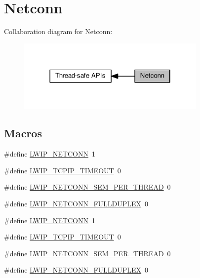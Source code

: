 \hypertarget{group__lwip__opts__netconn}{}\section{Netconn}
\label{group__lwip__opts__netconn}
Collaboration diagram for Netconn\+:
\nopagebreak
\begin{figure}[H]
\begin{center}
\leavevmode
\includegraphics[width=262pt]{group__lwip__opts__netconn}
\end{center}
\end{figure}
\subsection*{Macros}
\begin{DoxyCompactItemize}
\item 
\#define \hyperlink{group__lwip__opts__netconn_ga478041b8544461258f6961bf0f3c1a77}{L\+W\+I\+P\+\_\+\+N\+E\+T\+C\+O\+NN}~1
\item 
\#define \hyperlink{group__lwip__opts__netconn_ga1cd8d15a42262a0defaedabed126ea99}{L\+W\+I\+P\+\_\+\+T\+C\+P\+I\+P\+\_\+\+T\+I\+M\+E\+O\+UT}~0
\item 
\#define \hyperlink{group__lwip__opts__netconn_ga2543345adf7d2c307df78a54ac2ba8c4}{L\+W\+I\+P\+\_\+\+N\+E\+T\+C\+O\+N\+N\+\_\+\+S\+E\+M\+\_\+\+P\+E\+R\+\_\+\+T\+H\+R\+E\+AD}~0
\item 
\#define \hyperlink{group__lwip__opts__netconn_ga7bfe8487a3abffdd9d6730977d22c406}{L\+W\+I\+P\+\_\+\+N\+E\+T\+C\+O\+N\+N\+\_\+\+F\+U\+L\+L\+D\+U\+P\+L\+EX}~0
\item 
\#define \hyperlink{group__lwip__opts__netconn_ga478041b8544461258f6961bf0f3c1a77}{L\+W\+I\+P\+\_\+\+N\+E\+T\+C\+O\+NN}~1
\item 
\#define \hyperlink{group__lwip__opts__netconn_ga1cd8d15a42262a0defaedabed126ea99}{L\+W\+I\+P\+\_\+\+T\+C\+P\+I\+P\+\_\+\+T\+I\+M\+E\+O\+UT}~0
\item 
\#define \hyperlink{group__lwip__opts__netconn_ga2543345adf7d2c307df78a54ac2ba8c4}{L\+W\+I\+P\+\_\+\+N\+E\+T\+C\+O\+N\+N\+\_\+\+S\+E\+M\+\_\+\+P\+E\+R\+\_\+\+T\+H\+R\+E\+AD}~0
\item 
\#define \hyperlink{group__lwip__opts__netconn_ga7bfe8487a3abffdd9d6730977d22c406}{L\+W\+I\+P\+\_\+\+N\+E\+T\+C\+O\+N\+N\+\_\+\+F\+U\+L\+L\+D\+U\+P\+L\+EX}~0
\end{DoxyCompactItemize}


